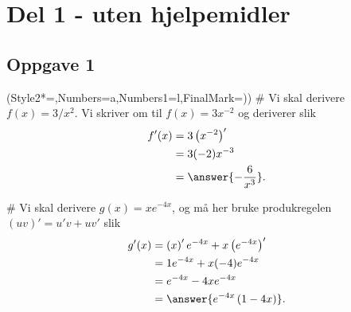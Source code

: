 


\newcommand{\fagkode}{S2}
\newcommand{\semesteraar}{våren 2014}
\newcommand{\forfatter}{Tommy O.}
\newcommand{\dokumenttittel}{Løsningsforslag -- Eksamen \fagkode, \semesteraar}


\newcommand{\logonavn}{figs/metis_akademiet_privatistskole_doclogo.png}




\section*{Del 1 - uten hjelpemidler}
\subsection*{Oppgave 1}
\begin{easylist}[enumerate]
\ListProperties(Style2*=,Numbers=a,Numbers1=l,FinalMark={)})
# Vi skal derivere $f(x) = 3/x^2$. 
Vi skriver om til $f(x) = 3x^{-2}$ og deriverer slik
\begin{align*}
	f'(x) &= 3 \left(x^{-2}\right)' \\
	      & = 3 (-2)x^{-3} \\
	      & = \answer{-\frac{6}{x^3}}.
\end{align*}


# Vi skal derivere $g(x) = xe^{-4x}$, og må her bruke produkregelen
$(uv)' = u'v + uv'$ slik
\begin{align*}
	g'(x) &= \left(x \right)' e^{-4x} +x \left( e^{-4x} \right)' \\
	& = 1 e^{-4x} + x (-4) e^{-4x}  \\
	& = e^{-4x} -4x e^{-4x}  \\
	& =  \answer{e^{-4x} \left( 1 - 4x\right) }.
\end{align*}
\end{easylist}

